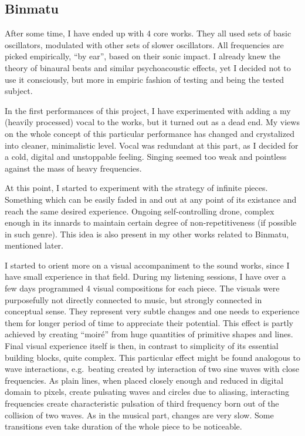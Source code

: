 \documentclass[12pt,a4paper,oneside]{report}
\begin{document}
\subsection{Binmatu}

After some time, I have ended up with 4 core works. They all used sets of basic oscillators, modulated with other sets of slower oscillators. All frequencies are picked empirically, ``by ear'', based on their sonic impact. I already knew the theory of binaural beats and similar psychoacoustic effects, yet I decided not to use it consciously, but more in empiric fashion of testing and being the tested subject.

In the first performances of this project, I have experimented with adding a my (heavily processed) vocal to the works, but it turned out as a dead end. My views on the whole concept of this particular performance has changed and crystalized into cleaner, minimalistic level. Vocal was redundant at this part, as I decided for a cold, digital and unstoppable feeling. Singing seemed too weak and pointless against the mass of heavy frequencies. 

At this point, I started to experiment with the strategy of infinite pieces. Something which can be easily faded in and out at any point of its existance and reach the same desired experience. Ongoing self-controlling drone, complex enough in its innards to maintain certain degree of non-repetitiveness (if possible in such genre). This idea is also present in my other works related to Binmatu, mentioned later. 

I started to orient more on a visual accompaniment to the sound works, since I have small experience in that field. During my listening sessions, I have over a few days programmed 4 visual compositions for each piece. The visuals were purposefully not directly connected to music, but strongly connected in conceptual sense. They represent very subtle changes and one needs to experience them for longer period of time to appreciate their potential. This effect is partly achieved by creating ``moiré'' from huge quantities of primitive shapes and lines. Final visual experience itself is then, in contrast to simplicity of its essential building blocks, quite complex. This particular effect might be found analogous to wave interactions, e.g.\ beating created by interaction of two sine waves with close frequencies. As plain lines, when placed closely enough and reduced in digital domain to pixels, create pulsating waves and circles due to aliasing, interacting frequencies create characteristic pulsation of third frequency born out of the collision of two waves. As in the musical part, changes are very slow. Some transitions even take duration of the whole piece to be noticeable.
\end{document}
